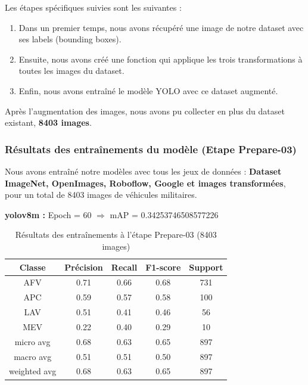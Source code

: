 \noindent Les étapes spécifiques suivies sont les suivantes :

\begin{enumerate}
    \item Dans un premier temps, nous avons récupéré une image de notre dataset avec ses labels (bounding boxes).
    \item Ensuite, nous avons créé une fonction qui applique les trois transformations à toutes les images du dataset.
    \item Enfin, nous avons entraîné le modèle YOLO avec ce dataset augmenté.
\end{enumerate}

Après l'augmentation des images, nous avons pu collecter en plus du dataset existant, \textbf{8403 images}.\\


\subsubsection{Résultats des entraînements du modèle (Etape Prepare-03) }
\label{results-prepare03}

Nous avons entraîné notre modèles avec tous les jeux de données :
\textbf{Dataset ImageNet, OpenImages, Roboflow, Google et images transformées}, pour un total de 8403 images de véhicules militaires.

\textbf{yolov8m :}
Epoch = 60 $\Rightarrow$ mAP = 0.34253746508577226

\begin{table}[H]
    \centering
    \begin{tabular}{|c|c|c|c|c|}
        \hline
        \textbf{Classe} & \textbf{Précision} & \textbf{Recall} & \textbf{F1-score} & \textbf{Support} \\ \hline
        AFV             & 0.71               & 0.66            & 0.68              & 731              \\ \hline
        APC             & 0.59               & 0.57            & 0.58              & 100              \\ \hline
        LAV             & 0.51               & 0.41            & 0.46              & 56               \\ \hline
        MEV             & 0.22               & 0.40            & 0.29              & 10               \\ \hline
        micro avg       & 0.68               & 0.63            & 0.65              & 897              \\ \hline
        macro avg       & 0.51               & 0.51            & 0.50              & 897              \\ \hline
        weighted avg    & 0.68               & 0.63            & 0.65              & 897              \\ \hline
    \end{tabular}
    \caption{Résultats des entraînements à l'étape Prepare-03 (8403 images)}
    \label{tab:results_moy_prepare03}
\end{table}

